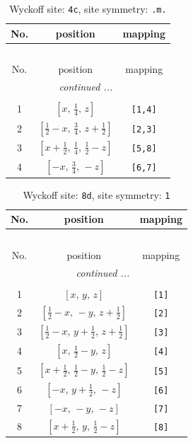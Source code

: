 \documentclass[fleqn,8pt]{jsarticle}
\begin{document}
\renewcommand{\arraystretch}{1.2}
\begin{longtable}{ccc}
\caption{Wyckoff site: {\tt 4c}, site symmetry: {\tt .m.}}
 \\
 \hline \hline
No. & position & mapping \\ \hline \endfirsthead

\multicolumn{2}{l}{\tablename\ \thetable{}} \\
 \hline \hline
No. & position & mapping \\ \hline \endhead

 \hline \hline
\multicolumn{2}{r}{\footnotesize\it continued ...} \\ \endfoot

 \hline \hline
\multicolumn{2}{r}{} \\ \endlastfoot

1 & $\left[ x,\, \frac{1}{4},\, z \right]$ & {\tt [1,4]} \\ \hline
2 & $\left[ \frac{1}{2} - x,\, \frac{3}{4},\, z + \frac{1}{2} \right]$ & {\tt [2,3]} \\ \hline
3 & $\left[ x + \frac{1}{2},\, \frac{1}{4},\, \frac{1}{2} - z \right]$ & {\tt [5,8]} \\ \hline
4 & $\left[ - x,\, \frac{3}{4},\, - z \right]$ & {\tt [6,7]} \\
\end{longtable}
\renewcommand{\arraystretch}{1.2}
\begin{longtable}{ccc}
\caption{Wyckoff site: {\tt 8d}, site symmetry: {\tt 1}}
 \\
 \hline \hline
No. & position & mapping \\ \hline \endfirsthead

\multicolumn{2}{l}{\tablename\ \thetable{}} \\
 \hline \hline
No. & position & mapping \\ \hline \endhead

 \hline \hline
\multicolumn{2}{r}{\footnotesize\it continued ...} \\ \endfoot

 \hline \hline
\multicolumn{2}{r}{} \\ \endlastfoot

1 & $\left[ x,\, y,\, z \right]$ & {\tt [1]} \\ \hline
2 & $\left[ \frac{1}{2} - x,\, - y,\, z + \frac{1}{2} \right]$ & {\tt [2]} \\ \hline
3 & $\left[ \frac{1}{2} - x,\, y + \frac{1}{2},\, z + \frac{1}{2} \right]$ & {\tt [3]} \\ \hline
4 & $\left[ x,\, \frac{1}{2} - y,\, z \right]$ & {\tt [4]} \\ \hline
5 & $\left[ x + \frac{1}{2},\, \frac{1}{2} - y,\, \frac{1}{2} - z \right]$ & {\tt [5]} \\ \hline
6 & $\left[ - x,\, y + \frac{1}{2},\, - z \right]$ & {\tt [6]} \\ \hline
7 & $\left[ - x,\, - y,\, - z \right]$ & {\tt [7]} \\ \hline
8 & $\left[ x + \frac{1}{2},\, y,\, \frac{1}{2} - z \right]$ & {\tt [8]} \\
\end{longtable}
\end{document}

